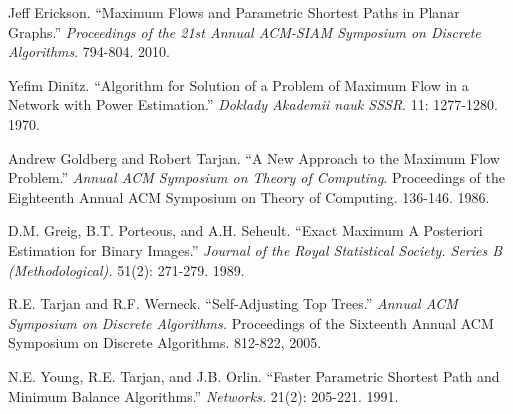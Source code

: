 \documentclass[12pt]{article}
\begin{document}
\begin{thebibliography}{9}

        Jeff Erickson.
       ``Maximum Flows and Parametric Shortest Paths in Planar Graphs.''
       \emph{Proceedings of the 21st Annual ACM-SIAM Symposium on Discrete Algorithms}.
       794-804.
       2010.

        Yefim Dinitz.
        ``Algorithm for Solution of a Problem of Maximum Flow in a Network with Power Estimation.''
        \emph{Doklady Akademii nauk SSSR}.
        11: 1277-1280.
        1970.

        Andrew Goldberg and Robert Tarjan.
        ``A New Approach to the Maximum Flow Problem.''
        \emph{Annual ACM Symposium on Theory of Computing}.
        Proceedings of the Eighteenth Annual ACM Symposium on Theory of Computing.
        136-146.
        1986.

        D.M. Greig, B.T. Porteous, and A.H. Seheult.
        ``Exact Maximum A Posteriori Estimation for Binary Images.''
        \emph{Journal of the Royal Statistical Society. Series B (Methodological).}
        51(2): 271-279.
        1989.

        R.E. Tarjan and R.F. Werneck.
        ``Self-Adjusting Top Trees.''
        \emph{Annual ACM Symposium on Discrete Algorithms.}
        Proceedings of the Sixteenth Annual ACM Symposium on Discrete Algorithms.
        812-822,
        2005.

        N.E. Young, R.E. Tarjan, and J.B. Orlin. 
        ``Faster Parametric Shortest Path and Minimum Balance Algorithms.''
        \emph{Networks.}
        21(2): 205-221.
        1991.

\end{thebibliography}
\end{document}
